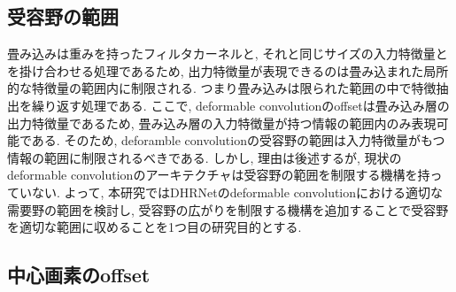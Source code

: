 \subsection{受容野の範囲}\label{subsec:mondaiten_jyuyouya}
畳み込みは重みを持ったフィルタカーネルと, それと同じサイズの入力特徴量とを掛け合わせる処理であるため, 出力特徴量が表現できるのは畳み込まれた局所的な特徴量の範囲内に制限される. つまり畳み込みは限られた範囲の中で特徴抽出を繰り返す処理である. ここで, deformable convolutionのoffsetは畳み込み層の出力特徴量であるため, 畳み込み層の入力特徴量が持つ情報の範囲内のみ表現可能である.
そのため, deforamble convolutionの受容野の範囲は入力特徴量がもつ情報の範囲に制限されるべきである. しかし, 理由は後述するが, 現状のdeformable convolutionのアーキテクチャは受容野の範囲を制限する機構を持っていない. よって, 本研究ではDHRNetのdeformable convolutionにおける適切な需要野の範囲を検討し, 受容野の広がりを制限する機構を追加することで受容野を適切な範囲に収めることを1つ目の研究目的とする.
\subsection{中心画素のoffset}\label{subsec:mondaiten_center_offset}
